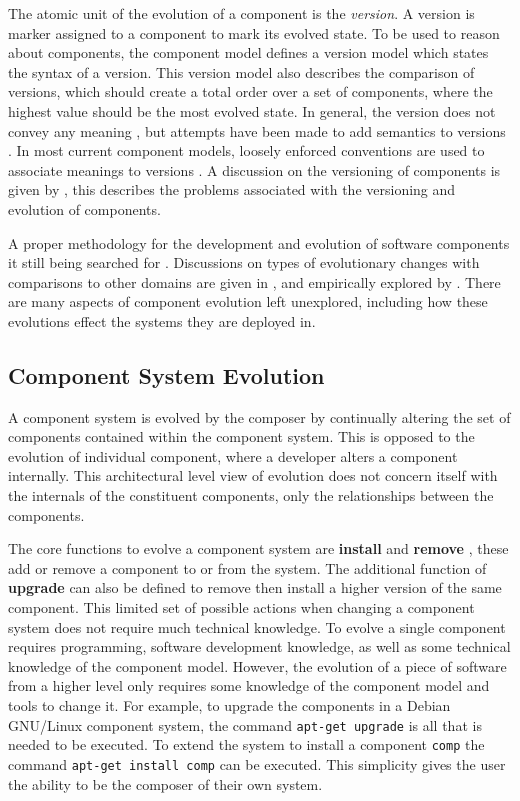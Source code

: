The atomic unit of the evolution of a component is the \textit{version}.
A version is marker assigned to a component to mark its evolved state.
To be used to reason about components, the component model defines a version model which states the syntax of a version.
This version model also describes the comparison of versions, which should create a total order over a set of components, where the highest value should be the most evolved state.
In general, the version does not convey any meaning \citep{Stuckenholz2005}, but attempts have been made to add semantics to versions \cite{Bauml2009}.
In most current component models, loosely enforced conventions are used to associate meanings to versions \cite{Barth2005,osgicore2007}.
A discussion on the versioning of components is given by \cite{Stuckenholz2005},
this describes the problems associated with the versioning and evolution of components.

A proper methodology for the development and evolution of software components it still being searched for \citep{Szyperski2002}.
Discussions on types of evolutionary changes with comparisons to other domains are given in \citep{Papazoglou2011},
and empirically explored by \cite{vasa2007patterns}.
There are many aspects of component evolution left unexplored, including how these evolutions effect the systems they are deployed in.

\subsection{Component System Evolution}
A component system is evolved by the composer by continually altering the set of components contained within the component system.
This is opposed to the evolution of individual component, where a developer alters a component internally.
This architectural level view of evolution does not concern itself with the internals of the constituent components, only the relationships between the components.

The core functions to evolve a component system are \textbf{install} and \textbf{remove} , these add or remove a component to or from the system.
The additional function of \textbf{upgrade} can also be defined to remove then install a higher version of the same component. 
This limited set of possible actions when changing a component system does not require much technical knowledge. 
To evolve a single component requires programming, software development knowledge, as well as some technical knowledge of the component model.
However, the evolution of a piece of software from a higher level only requires some knowledge of the component model and tools to change it.
For example, to upgrade the components in a Debian GNU/Linux component system, the command \texttt{apt-get upgrade} is all that is needed to be executed.
To extend the system to install a component \texttt{comp} the command \texttt{apt-get install comp} can be executed.
This simplicity gives the user the ability to be the composer of their own system.

